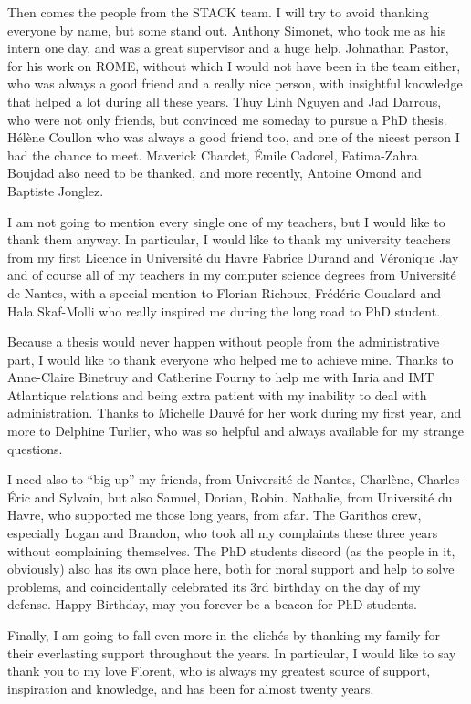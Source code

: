 Then comes the people from the STACK team.
%
I will try to avoid thanking everyone by name, but some stand out.
%
Anthony Simonet, who took me as his intern one day, and was a great
supervisor and a huge help.
%
Johnathan Pastor, for his work on ROME, without which I would not have
been in the team either, who was always a good friend and a really
nice person, with insightful knowledge that helped a lot during all
these years.
%
Thuy Linh Nguyen and Jad Darrous, who were not only friends, but
convinced me someday to pursue a PhD thesis.
%
Hélène Coullon who was always a good friend too, and one of the nicest
person I had the chance to meet.
%
Maverick Chardet, Émile Cadorel, Fatima-Zahra Boujdad also need to be
thanked, and more recently, Antoine Omond and Baptiste Jonglez.


I am not going to mention every single one of my teachers, but I would
like to thank them anyway.
%
In particular, I would like to thank my university teachers from my
first Licence in Université du Havre Fabrice Durand and Véronique Jay
and of course all of my teachers in my computer science degrees from
Université de Nantes, with a special mention to Florian Richoux,
Frédéric Goualard and Hala Skaf-Molli who really inspired me during
the long road to PhD student.

Because a thesis would never happen without people from the
administrative part, I would like to thank everyone who helped me to
achieve mine.
%
Thanks to Anne-Claire Binetruy and Catherine Fourny to help me with
Inria and IMT Atlantique relations and being extra patient with my
inability to deal with administration.
%
Thanks to Michelle Dauvé for her work during my first year, and more
to Delphine Turlier, who was so helpful and always available for my
strange questions.

I need also to ``big-up'' my friends, from Université de
Nantes, Charlène, Charles-Éric and Sylvain, but also Samuel, Dorian,
Robin.
%
Nathalie, from Université du Havre, who supported me those long years,
from afar.
%
The Garithos crew, especially Logan and Brandon, who took all my
complaints these three years without complaining themselves.
%
The PhD students discord (as the people in it, obviously) also has its
own place here, both for moral support and help to solve problems, and
coincidentally celebrated its 3rd birthday on the day of my
defense. Happy Birthday, may you forever be a beacon for PhD students.


Finally, I am going to fall even more in the clichés by thanking my
family for their everlasting support throughout the years.
%
In particular, I would like to say thank you to my love Florent, who
is always my greatest source of support, inspiration and knowledge,
and has been for almost twenty years.
